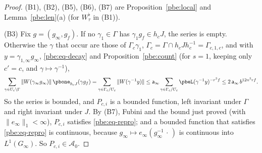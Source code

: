 \documentclass[10pt]{amsart}
\theoremstyle{definition}
\theoremstyle{remark}
\providecommand{\auAz}{\mathcal A_0}
\begin{document}
\begin{proof}
(B1), (B2), (B5), (B6), (B7) are Proposition~\ref{pbe:local} and Lemma~\ref{pbe:len}(a) (for
$W_\tau^\flat$ in (B1)).

(B3) Fix $g=(g_\infty,g_f)$. If no $\gamma_1\in\Gamma$ has $\gamma_1g_f\in h_cJ$, the series is
empty. Otherwise the $\gamma$ that occur are those of $\Gamma_c\gamma_1$, $\Gamma_c=\Gamma\cap h_cJh_c
^{-1}=\Gamma_{c,1,c}$, and with $y=\gamma_{1,\infty}g_\infty$, \eqref{pbe:eq-decay} and
Proposition~\ref{pbe:count} (for $s=1$, keeping only $c'=c$, and $\gamma\mapsto\gamma^{-1}$),
\[
\sum_{\gamma\in U_c\backslash\Gamma}\|W(\gamma_\infty g_\infty)\|\,\pbone_{h_cJ}(\gamma g_f)=\sum_{
\gamma\in\Gamma_c/U_c}\|W(\gamma^{-1}y)\|\le\mathsf a_\infty\sum_{\gamma\in\Gamma_c/U_c}\pbeL(\gamma^{
-1}y)^{-r^3f}\le2\,\mathsf a_\infty\,b^{12n^3rf}.
\]
So the series is bounded, and $P_{c,i}$ is a bounded function, left invariant under $\Gamma$ and
right invariant under $J$. By (B7), Fubini and the bound just proved (with $\|e_\infty\|_1<\infty$),
$P_{c,i}$ satisfies \eqref{pbe:eq-repro}; and a bounded function that satisfies \eqref{pbe:eq-repro}
is continuous, because $g_\infty\mapsto e_\infty(g_\infty^{-1}\,\cdot\,)$ is continuous into
$L^1(G_\infty)$. So $P_{c,i}\in\auAz$.


\end{proof}
\end{document}
